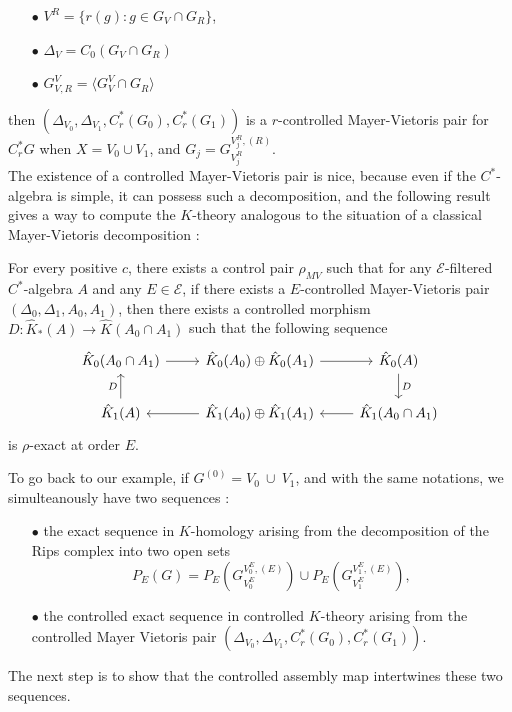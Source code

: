 \begin{itemize}
\item[$\bullet$] $V^R= \{r(g) : g\in G_V\cap G_R\}$,
\item[$\bullet$] $\Delta_V = C_0(G_V\cap G_R)$
\item[$\bullet$] $G_{V,R}^V = \langle G_V^V \cap G_R \rangle$\\
\end{itemize} 

then $(\Delta_{V_0},\Delta_{V_1}, C_r^*(G_0),C_r^*(G_1))$ is a $r$-controlled Mayer-Vietoris pair for $C^*_r G$ when $X=V_0\cup V_1$, and $G_j = G_{V_j^R}^{V_j^R , (R)}$.\\

The existence of a controlled Mayer-Vietoris pair is nice, because even if the $C^*$-algebra is simple, it can possess such a decomposition, and the following result gives a way to compute the $K$-theory analogous to the situation of a classical Mayer-Vietoris decomposition :

\begin{thm}
For every positive $c$, there exists a control pair $\rho_{MV}$ such that for any $\mathcal E$-filtered $C^*$-algebra $A$ and any $E\in\mathcal E$, if there exists a $E$-controlled Mayer-Vietoris pair $(\Delta_0,\Delta_1,A_0,A_1)$, then there exists a controlled morphism $D : \hat K_*(A)\rightarrow \hat K(A_0\cap A_1)$ such that the following sequence 
\[\begin{tikzcd}
\hat K_0(A_0\cap A_1 ) \arrow{r}& \hat K_0(A_0)\arrow{r}\oplus \hat K_0(A_1) & \hat K_0(A)\arrow{d}{D} \\
\arrow{u}{D}\hat K_1(A) &\arrow{l} \hat K_1(A_0)\oplus \hat K_1(A_1) & \arrow{l}\hat K_1(A_0\cap A_1) 
\end{tikzcd}\]
is $\rho$-exact at order $E$.
\end{thm}

To go back to our example, if $G^{(0)} = V_0\ \cup \ V_1 $, and with the same notations, we simulteanously have two sequences : \\
\begin{itemize}
\item[$\bullet$] the exact sequence in $K$-homology arising from the decomposition of the Rips complex into two open sets 
\[P_E(G) = P_E(G^{V_0^E,(E)}_{V_0^E}) \cup P_E(G^{V_1^E,(E)}_{V_1^E}) ,\] 
\item[$\bullet$] the controlled exact sequence in controlled $K$-theory arising from the controlled Mayer Vietoris pair $(\Delta_{V_0},\Delta_{V_1}, C_r^*(G_0),C_r^*(G_1))$. \\
\end{itemize}
The next step is to show that the controlled assembly map intertwines these two sequences. \\

